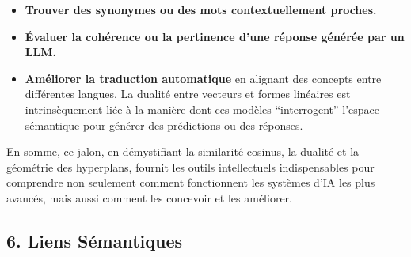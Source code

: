 \documentclass[11pt,a4paper]{report}
\begin{document}
\begin{itemize}
\begin{enumerate}
    \begin{itemize}

    \item
      \textbf{Trouver des synonymes ou des mots contextuellement
      proches.}
    \item
      \textbf{Évaluer la cohérence ou la pertinence d'une réponse
      générée par un LLM.}
    \item
      \textbf{Améliorer la traduction automatique} en alignant des
      concepts entre différentes langues. La dualité entre vecteurs et
      formes linéaires est intrinsèquement liée à la manière dont ces
      modèles ``interrogent'' l'espace sémantique pour générer des
      prédictions ou des réponses.
    \end{itemize}
  \end{enumerate}
\end{itemize}

En somme, ce jalon, en démystifiant la similarité cosinus, la dualité et
la géométrie des hyperplans, fournit les outils intellectuels
indispensables pour comprendre non seulement comment fonctionnent les
systèmes d'IA les plus avancés, mais aussi comment les concevoir et les
améliorer.

\hypertarget{liens-suxe9mantiques}{%
\subsection{6. Liens Sémantiques}\label{liens-suxe9mantiques}}
\end{document}
